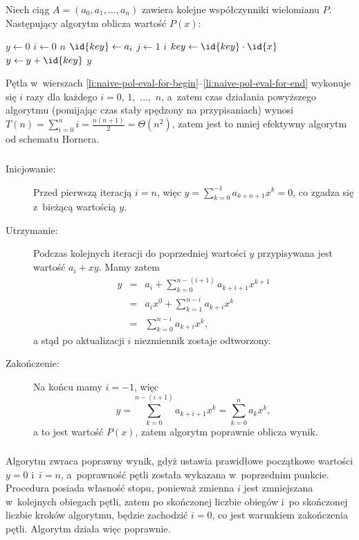 \subsubsection{} %
Niech ciąg $A=(a_0,a_1,\dots,a_n)$ zawiera kolejne współczynniki wielomianu $P$. Następujący algorytm oblicza wartość $P(x)$:
\begin{codebox}
\li	$y\gets0$
\li	\For $i\gets0$ \To $n$
\li		\Do
			$\id{key}\gets a_i$
\li			\For $j\gets1$ \To $i$ \label{li:naive-pol-eval-for-begin}
\li				\Do
					$key\gets\id{key}\cdot\id{x}$
				\End \label{li:naive-pol-eval-for-end}
\li			$y\gets y+\id{key}$
		\End
\li	\Return $y$
\end{codebox}
Pętla  w~wierszach \ref{li:naive-pol-eval-for-begin}--\ref{li:naive-pol-eval-for-end} wykonuje się $i$ razy dla każdego $i=0$, $1$,~$\dots$,~$n$, a~zatem czas działania powyższego algorytmu (pomijając czas stały spędzony na przypisaniach) wynosi $T(n)=\sum_{i=0}^ni=\frac{n(n+1)}{2}=\Theta(n^2)$, zatem jest to mniej efektywny algorytm od schematu Hornera.

\subsubsection{} %
\begin{description}
	\item[Inicjowanie:] Przed pierwszą iteracją $i=n$, więc $y=\sum_{k=0}^{-1}a_{k+n+1}x^k=0$, co zgadza się z~bieżącą wartością $y$.
	\item[Utrzymanie:] Podczas kolejnych iteracji do poprzedniej wartości $y$ przypisywana jest wartość $a_i+xy$. Mamy zatem
	\begin{eqnarray*}
		y &=& a_i+\sum_{k=0}^{n-(i+1)}a_{k+i+1}x^{k+1} \\
		&=& a_ix^0+\sum_{k=1}^{n-i}a_{k+i}x^k \\
		&=& \sum_{k=0}^{n-i}a_{k+i}x^k,
	\end{eqnarray*}
	a stąd po aktualizacji $i$ niezmiennik zostaje odtworzony.
	\item[Zakończenie:] Na końcu mamy $i=-1$, więc
	\[
		y = \sum_{k=0}^{n-(i+1)}a_{k+i+1}x^k = \sum_{k=0}^na_kx^k,
	\]
	a to jest wartość $P(x)$, zatem algorytm poprawnie oblicza wynik.
\end{description}

\subsubsection{} %
Algorytm zwraca poprawny wynik, gdyż ustawia prawidłowe początkowe wartości $y=0$ i~$i=n$, a~poprawność pętli  została wykazana w~poprzednim punkcie. Procedura posiada własność stopu, ponieważ zmienna $i$ jest zmniejszana w~kolejnych obiegach pętli, zatem po skończonej liczbie obiegów i~po skończonej liczbie kroków algorytmu, będzie zachodzić $i=0$, co jest warunkiem zakończenia pętli. Algorytm działa więc poprawnie.

